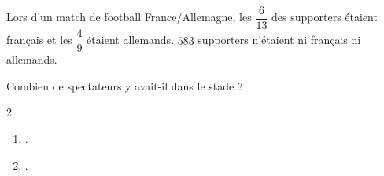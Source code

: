 \begin{exercice*}[Foot]
    Lors d'un match de football France/Allemagne, les $\dfrac{6}{13}$ des supporters
    étaient français et les $\dfrac{4}{9}$ étaient allemands. $583$ supporters n'étaient ni
    français ni allemands.
    
    Combien de spectateurs y avait-il dans le stade ?
\end{exercice*}
\begin{corrige}
    \phantom{rrr}    
    \begin{multicols}2
        \begin{enumerate}
            \item .
            \item .
        \end{enumerate}
    \end{multicols}
\end{corrige}

